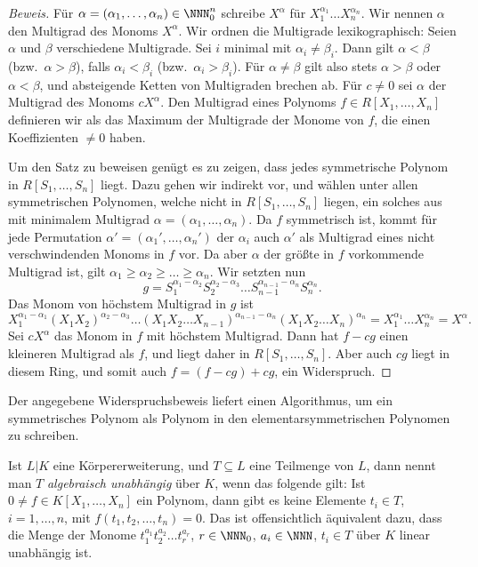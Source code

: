 \documentclass[12pt,a4paper,twoside]{article}
\newcommand{\ei}[1]{\emph{#1}\index{#1}}
\begin{document}
\begin{proof}[Beweis]
  F\"ur $\alpha=(\alpha_1,\dots,\alpha_n)\in\NNN_0^n$ schreibe $X^\alpha$
  f\"ur $X_1^{\alpha_1}\dots X_n^{\alpha_n}$. Wir nennen $\alpha$ den
  Multigrad des Monoms $X^\alpha$. Wir ordnen die Multigrade lexikographisch:
  Seien $\alpha$ und $\beta$ verschiedene Multigrade. Sei $i$ minimal mit
  $\alpha_i\ne\beta_i$. Dann gilt $\alpha<\beta$ (bzw.\ $\alpha>\beta$), falls
  $\alpha_i<\beta_i$ (bzw.\ $\alpha_i>\beta_i$). F\"ur $\alpha\ne\beta$ gilt
  also stets $\alpha>\beta$ oder $\alpha<\beta$, und absteigende Ketten von
  Multigraden brechen ab. F\"ur $c\ne0$ sei $\alpha$ der Multigrad des Monoms
  $cX^\alpha$. Den Multigrad eines Polynoms $f\in R[X_1,\dots,X_n]$ definieren
  wir als das Maximum der Multigrade der Monome von $f$, die einen
  Koeffizienten $\ne0$ haben.
  
  Um den Satz zu beweisen gen\"ugt es zu zeigen, dass jedes symmetrische
  Polynom in $R[S_1,\dots,S_n]$ liegt. Dazu gehen wir indirekt vor, und
  w\"ahlen unter allen symmetrischen Polynomen, welche nicht in
  $R[S_1,\dots,S_n]$ liegen, ein solches aus mit minimalem Multigrad
  $\alpha=(\alpha_1,\dots,\alpha_n)$. Da $f$ symmetrisch ist, kommt f\"ur jede
  Permutation $\alpha'=(\alpha_1',\dots,\alpha_n')$ der $\alpha_i$ auch
  $\alpha'$ als Multigrad eines nicht verschwindenden Monoms in $f$ vor. Da
  aber $\alpha$ der gr\"o\ss te in $f$ vorkommende Multigrad ist, gilt
  $\alpha_1\ge\alpha_2\ge\dots\ge\alpha_n$. Wir setzten nun
\[
g=S_1^{\alpha_1-\alpha_2}S_2^{\alpha_2-\alpha_3}\dots
S_{n-1}^{\alpha_{n-1}-\alpha_n}S_n^{\alpha_n}.
\]
Das Monom von h\"ochstem Multigrad in $g$ ist
\[
X_1^{\alpha_1-\alpha_1}(X_1X_2)^{\alpha_2-\alpha_3}\dots (X_1X_2\dots
X_{n-1})^{\alpha_{n-1}-\alpha_n}(X_1X_2\dots X_n)^{\alpha_n}=
X_1^{\alpha_1}\dots X_n^{\alpha_n}=X^\alpha.
\]
Sei $cX^\alpha$ das Monom in $f$ mit h\"ochstem Multigrad. Dann hat $f-cg$
einen kleineren Multigrad als $f$, und liegt daher in $R[S_1,\dots,S_n]$. Aber
auch $cg$ liegt in diesem Ring, und somit auch $f=(f-cg)+cg$, ein Widerspruch.
\end{proof}
\begin{Bemerkung*}
Der angegebene Widerspruchsbeweis liefert einen Algorithmus, um ein
symmetrisches Polynom als Polynom in den elementarsymmetrischen Polynomen zu
schreiben.
\end{Bemerkung*}
Ist $L|K$ eine K\"orpererweiterung, und $T\subseteq L$ eine Teilmenge von $L$,
dann nennt man $T$ \ei{algebraisch unabh\"angig} \"uber $K$, wenn das folgende
gilt: Ist $0\ne f\in K[X_1,\dots,X_n]$ ein Polynom, dann gibt es keine
Elemente $t_i\in T$, $i=1,\dots,n$, mit $f(t_1,t_2,\dots,t_n)=0$. Das ist
offensichtlich \"aquivalent dazu, dass die Menge der Monome
$t_1^{a_1}t_2^{a_2}\dots t_r^{a_r}$, $r\in\NNN_0$, $a_i\in\NNN$, $t_i\in T$
\"uber $K$ linear unabh\"angig ist.
\end{document}
